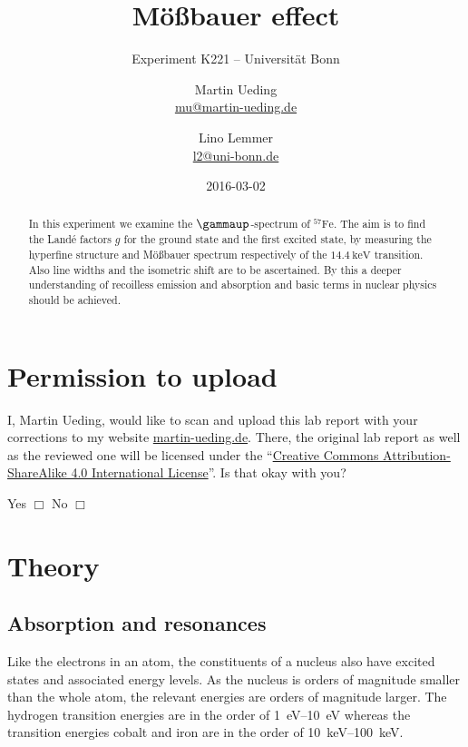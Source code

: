 \documentclass[11pt, english, fleqn, DIV=15, headinclude, BCOR=2cm]{scrreprt}
\title{Mößbauer effect}
\subtitle{Experiment K221 -- Universität Bonn}
\author{%
    Martin Ueding \\
    \small{\href{mailto:mu@martin-ueding.de}{mu@martin-ueding.de}}
    \and
    Lino Lemmer \\
    \small{\href{mailto:l2@uni-bonn.de}{l2@uni-bonn.de}}
}
\date{2016-03-02}
\begin{document}
\maketitle

\begin{abstract}
    In this experiment we examine the $\gammaup$-spectrum of
    $^{57}\mathrm{Fe}$. The aim is to find the Landé factors $g$ for the ground
    state and the first excited state, by measuring the hyperfine structure and
    Mößbauer spectrum respectively of the $\SI{14.4}{\kilo\electronvolt}$
    transition. Also line widths and the isometric shift are to be ascertained.
    By this a deeper understanding of recoilless emission and absorption and
    basic terms in nuclear physics should be achieved.
\end{abstract}

\tableofcontents

\chapter*{Permission to upload}

I, Martin Ueding, would like to scan and upload this lab report with your
corrections to my website \href{http://martin-ueding.de}{martin-ueding.de}.
There, the original lab report as well as the reviewed one will be licensed
under the “\href{http://creativecommons.org/licenses/by-sa/4.0/}{Creative
Commons Attribution-ShareAlike 4.0 International License}”. Is that okay with
you?

Yes $\Box$ \hspace{2cm} No $\Box$

\chapter{Theory}

\section{Absorption and resonances}

Like the electrons in an atom, the constituents of a nucleus also have
excited states and associated energy levels. As the nucleus is orders of
magnitude smaller than the whole atom, the relevant energies are orders of
magnitude larger. The hydrogen transition energies are in the order of
\SIrange{1}{10}{\electronvolt} whereas the transition energies cobalt and iron
are in the order of \SIrange{10}{100}{\kilo\electronvolt}.
\end{document}

